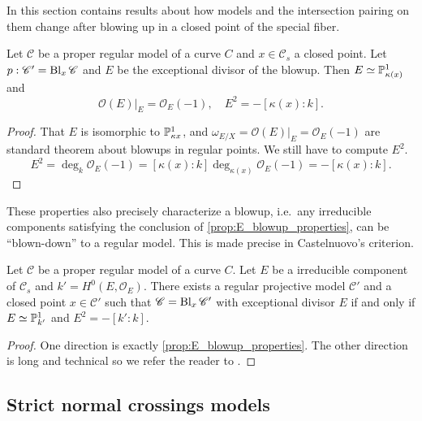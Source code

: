 In this section contains results about how models and the intersection pairing on them change after blowing up in a closed point of the special fiber.  

\begin{proposition}\label{prop:E_blowup_properties}
	Let $\mathscr C$ be a proper regular model of a curve $C$ and $x \in \mathscr C_s$ a closed point. 
	Let $p: \mathscr C' = \operatorname{Bl}_x \mathscr C$ and $E$ be the exceptional divisor of the blowup. 
	Then $E \simeq \mathbb{P}^{1}_{\kappa(x)}$ and \[
		\mathcal{O}(E)|_E = \mathcal{O}_E(-1), \quad E^2 = -[\kappa (x): k]
	.\] 
\end{proposition}
\begin{proof}
	That $E$ is isomorphic to $\mathbb{P}^{1}_{\kappa x}$, and $\omega_{E / X} = \mathcal{O}(E)|_E = \mathcal{O}_E(-1)$ are standard theorem about blowups in regular points. 
	We still have to compute $E^2$. 
	\[
		E^2 = \deg_k \mathcal{O}_E(-1) = [\kappa(x): k] \deg_{\kappa (x)} \mathcal{O}_E(-1) = -[\kappa(x): k]
	.\] 
\end{proof}

These properties also precisely characterize a blowup, i.e.\ any irreducible components satisfying the conclusion of \cref{prop:E_blowup_properties}, can be ``blown-down'' to a regular model.
This is made precise in Castelnuovo's criterion. 

\begin{theorem}
	Let $\mathscr C$ be a proper regular model of a curve $C$.
	Let $E$ be a irreducible component of $\mathscr C_s$ and $k' = H^{0}(E, \mathcal{O}_E)$. 
	There exists a regular projective model $\mathscr C'$ and a closed point $x \in \mathscr C'$ such that $\mathscr C = \operatorname{Bl}_x \mathscr C'$ with exceptional divisor $E$ if and only if $E \simeq \mathbb{P}_{k'}^{1}$ and $E^2 = -[k': k]$. 
\end{theorem}
\begin{proof}
	One direction is exactly \cref{prop:E_blowup_properties}. 
	The other direction is long and technical so we refer the reader to \cite[sec.\ 9.3.1]{liuAlgebraicGeometryArithmetic2002}.
\end{proof}

\subsection{Strict normal crossings models} \label{sec:strict_normal_crossings_models}

